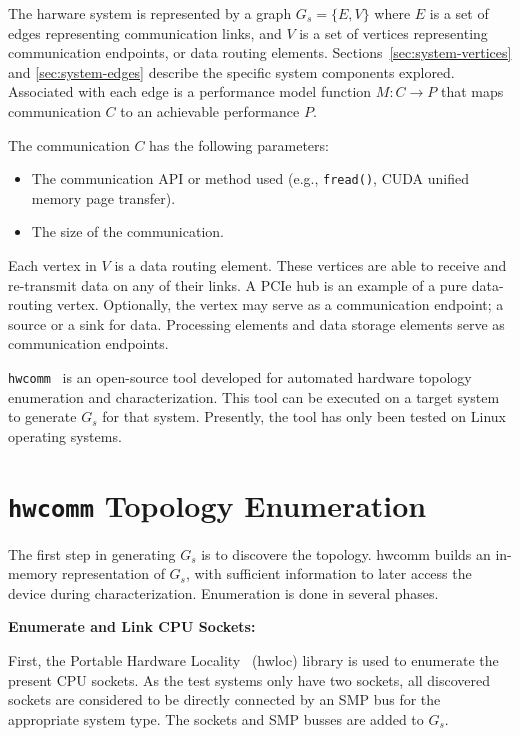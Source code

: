 The harware system is represented by a graph $G_s = \{E,V\}$ where $E$ is a set of edges representing communication links, and $V$ is a set of vertices representing communication endpoints, or data routing elements.
Sections~\ref{sec:system-vertices} and \ref{sec:system-edges} describe the specific system components explored.
Associated with each edge is a performance model function $M: C \rightarrow P$ that maps communication $C$ to an achievable performance $P$.

The communication $C$ has the following parameters:
\begin{itemize}
    \item The communication API or method used (e.g., \texttt{fread()}, CUDA unified memory page transfer).
    \item The size of the communication.
\end{itemize}


Each vertex in $V$ is a data routing element.
These vertices are able to receive and re-transmit data on any of their links.
A PCIe hub  is an example of a pure data-routing vertex.
Optionally, the vertex may serve as a communication endpoint; a source or a sink for data.
Processing elements and data storage elements serve as communication endpoints.


\texttt{hwcomm}~\cite{pearson2018hwcomm} is an open-source tool developed for automated hardware topology enumeration and characterization.
This tool can be executed on a target system to generate $G_s$ for that system.
Presently, the tool has only been tested on Linux operating systems.

%
%
\section{\texttt{hwcomm} Topology Enumeration}
\label{sec:topology-exploration}

The first step in generating $G_s$ is to discovere the topology.
hwcomm builds an in-memory representation of $G_s$, with sufficient information to later access the device during characterization.
Enumeration is done in several phases.

\textbf{Enumerate and Link CPU Sockets:}

First, the Portable Hardware Locality~\cite{broquedis2010hwloc} (hwloc) library is used to enumerate the present CPU sockets.
As the test systems only have two sockets, all discovered sockets are considered to be directly connected by an SMP bus for the appropriate system type.
The sockets and SMP busses are added to $G_s$.


